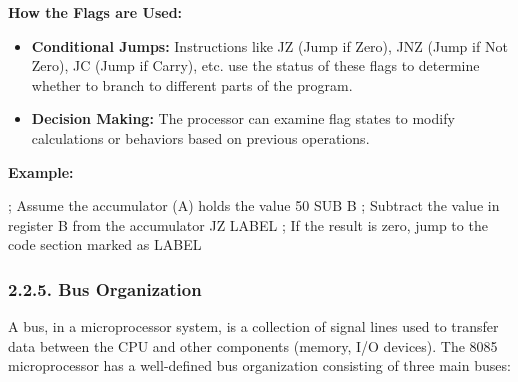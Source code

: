 \documentclass[
]{article}
\newenvironment{Shaded}{}{}
\newcommand{\NormalTok}[1]{#1}
\begin{document}
\textbf{How the Flags are Used:}

\begin{itemize}
\item
  \textbf{Conditional Jumps:} Instructions like JZ (Jump if Zero), JNZ
  (Jump if Not Zero), JC (Jump if Carry), etc. use the status of these
  flags to determine whether to branch to different parts of the
  program.
\item
  \textbf{Decision Making:} The processor can examine flag states to
  modify calculations or behaviors based on previous operations.
\end{itemize}

\textbf{Example:}

\begin{Shaded}
\begin{Highlighting}[]
\NormalTok{; Assume the accumulator (A) holds the value 50}
\NormalTok{SUB B  ; Subtract the value in register B from the accumulator}
\NormalTok{JZ LABEL  ; If the result is zero, jump to the code section marked as LABEL}
\end{Highlighting}
\end{Shaded}

\hypertarget{225-bus-organization}{%
\subsubsection{2.2.5. Bus Organization}\label{225-bus-organization}}

A bus, in a microprocessor system, is a collection of signal lines used
to transfer data between the CPU and other components (memory, I/O
devices). The 8085 microprocessor has a well-defined bus organization
consisting of three main buses:
\end{document}
